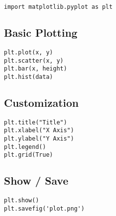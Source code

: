 \documentclass[a4paper,10pt]{article}
\begin{document}
\begin{tcolorbox}[colback=lightgray, title=Import]
\begin{Verbatim}[fontsize=\small]
import matplotlib.pyplot as plt
\end{Verbatim}
\end{tcolorbox}

\subsection*{Basic Plotting}
\begin{Verbatim}[fontsize=\small]
plt.plot(x, y)
plt.scatter(x, y)
plt.bar(x, height)
plt.hist(data)
\end{Verbatim}

\subsection*{Customization}
\begin{Verbatim}[fontsize=\small]
plt.title("Title")
plt.xlabel("X Axis")
plt.ylabel("Y Axis")
plt.legend()
plt.grid(True)
\end{Verbatim}

\subsection*{Show / Save}
\begin{Verbatim}[fontsize=\small]
plt.show()
plt.savefig('plot.png')
\end{Verbatim}
\end{document}

